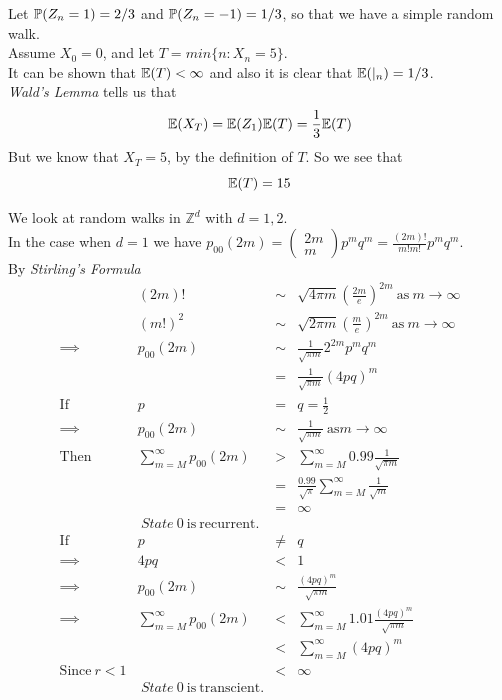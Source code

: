 \documentclass[11pt,a4paper]{article}
\begin{document}
Let $\mathbb{P}(Z_n=1)=2/3$ and $\mathbb{P}(Z_n=-1)=1/3$, so that we have a simple random walk.\\
Assume $X_0=0$, and let $T=min\{n:X_n=5\}$.\\
It can be shown that $\mathbb{E}(T)<\infty$ and also it is clear that $\mathbb{E}(|_n)=1/3$.\\
\textit{Wald's Lemma} tells us that
$$\mathbb{E}(X_T)=\mathbb{E}(Z_1)\mathbb{E}(T)=\frac{1}{3}\mathbb{E}(T)$$
But we know that $X_T=5$, by the definition of $T$. So we see that
$$\mathbb{E}(T)=15$$

We look at random walks in $\mathbb{Z}^d$ with $d=1,2$.\\
In the case when $d=1$ we have $p_{00}(2m)=\begin{pmatrix}2m\\m\end{pmatrix}p^mq^m=\frac{(2m)!}{m!m!}p^mq^m$.\\
By \textit{Stirling's Formula}
\[\begin{array}{rrcl}
&(2m)!&\sim&\sqrt{4\pi m}\left(\frac{2m}{e}\right)^{2m}\ \mathrm{as}\ m\to\infty\\
&(m!)^2&\sim&\sqrt{2\pi m}\left(\frac{m}{e}\right)^{2m}\ \mathrm{as}\ m\to\infty\\
\implies&p_{00}(2m)&\sim&\frac{1}{\sqrt{\pi m}}2^{2m}p^mq^m\\
&&=&\frac{1}{\sqrt{\pi m}}(4pq)^m\\
\mathrm{If}&p&=&q=\frac{1}{2}\\
\implies&p_{00}(2m)&\sim&\frac{1}{\sqrt{\pi m}}\ \mathrm{as} m\to\infty\\
\mathrm{Then}&\sum_{m=M}^\infty p_{00}(2m)&>&\sum_{m=M}^\infty 0.99\frac{1}{\sqrt{\pi m}}\\
&&=&\frac{0.99}{\sqrt{\pi}}\sum_{m=M}^\infty\frac{1}{\sqrt{m}}\\
&&=&\infty\\
&\mathrm\ {State\ } 0\mathrm{\ is\ recurrent}.\\
\mathrm{If}&p&\neq& q\\
\implies&4pq&<&1\\
\implies&p_{00}(2m)&\sim&\frac{(4pq)^m}{\sqrt{\pi m}}\\
\implies&\sum_{m=M}^\infty p_{00}(2m)&<&\sum_{m=M}^\infty 1.01\frac{(4pq)^m}{\sqrt{\pi m}}\\
&&<&\sum_{m=M}^\infty (4pq)^m\\
\mathrm{Since}\ r<1&&<&\infty\\
&\mathrm\ {State\ } 0 \mathrm{\ is\ transcient}.\\
\end{array}\]
\end{document}
